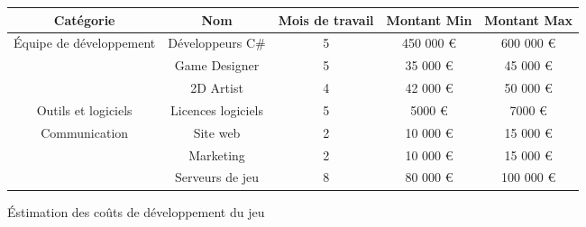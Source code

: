 \begin{figure}[H]
    \centering
    \begin{tabular}{|c|c|c|c|c|}
        \hline
        Cat\'egorie & Nom & Mois de travail & Montant Min & Montant Max \\
        \hline
        \multirow{3}{*}{\'Equipe de d\'eveloppement} & Développeurs C\# & 5 & 450 000 \euro  & 600 000 \euro \\
        \cline{2-5}
        & Game Designer & 5 & 35 000 \euro & 45 000 \euro \\
        \cline{2-5}
        & 2D Artist & 4 & 42 000 \euro & 50 000 \euro \\
        \hline
        Outils et logiciels & Licences logiciels & 5 & 5000 \euro & 7000 \euro \\
        \hline
        \multirow{2}{*}{Communication} & Site web & 2 & 10 000 \euro & 15 000 \euro \\
        \cline{2-5}
        & Marketing & 2 & 10 000 \euro & 15 000 \euro \\
        \hline
         & Serveurs de jeu & 8 & 80 000 \euro & 100 000 \euro \\




    \end{tabular}
    \caption{\'Estimation des co\^uts de développement du jeu}
    \label{fig:couts_de_dev}
\end{figure}




